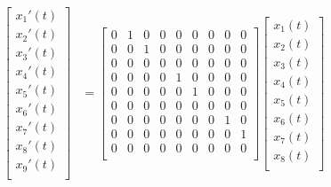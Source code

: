 \documentclass[12pt,a4paper]{article}
\begin{document}
\[
    \begin{aligned}
        \begin{bmatrix}
            x_1'(t) \\
            x_2'(t) \\
            x_3'(t) \\
            x_4'(t) \\
            x_5'(t) \\
            x_6'(t) \\
            x_7'(t) \\
            x_8'(t) \\
            x_9'(t) \\
        \end{bmatrix} & = \begin{bmatrix}
                            0 & 1 & 0 & 0 & 0 & 0 & 0 & 0 & 0 \\
                            0 & 0 & 1 & 0 & 0 & 0 & 0 & 0 & 0 \\
                            0 & 0 & 0 & 0 & 0 & 0 & 0 & 0 & 0 \\
                            0 & 0 & 0 & 0 & 1 & 0 & 0 & 0 & 0 \\
                            0 & 0 & 0 & 0 & 0 & 1 & 0 & 0 & 0 \\
                            0 & 0 & 0 & 0 & 0 & 0 & 0 & 0 & 0 \\
                            0 & 0 & 0 & 0 & 0 & 0 & 0 & 1 & 0 \\
                            0 & 0 & 0 & 0 & 0 & 0 & 0 & 0 & 1 \\
                            0 & 0 & 0 & 0 & 0 & 0 & 0 & 0 & 0 \\
                        \end{bmatrix} \begin{bmatrix}
                                        x_1(t) \\
                                        x_2(t) \\
                                        x_3(t) \\
                                        x_4(t) \\
                                        x_5(t) \\
                                        x_6(t) \\
                                        x_7(t) \\
                                        x_8(t) \\

\end{bmatrix}
\end{aligned}\]
\end{document}
